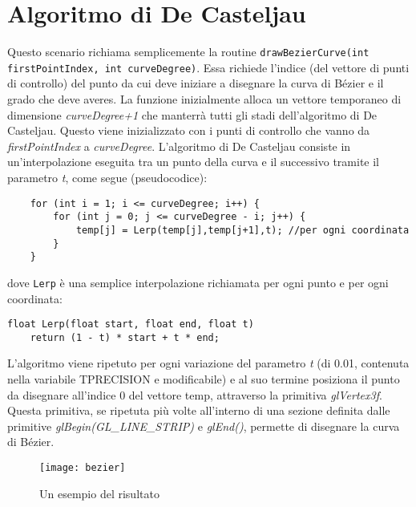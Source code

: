 \newpage
\section{Algoritmo di De Casteljau}
\label{decasteljau}
Questo scenario richiama semplicemente la routine \texttt{drawBezierCurve\-(int firstPointIndex, \-int curveDegree)}. Essa richiede l'indice (del vettore di punti di controllo) del punto da cui deve iniziare a disegnare la curva di Bézier e il grado che deve averes.
La funzione inizialmente alloca un vettore temporaneo di dimensione \textit{curveDegree+1} che manterrà tutti gli stadi dell'algoritmo di De Casteljau. Questo viene inizializzato con i punti di controllo che vanno da \textit{firstPointIndex} a \textit{curveDegree}. L'algoritmo di De Casteljau consiste in un'interpolazione eseguita tra un punto della curva e il successivo tramite il parametro \textit{t}, come segue (pseudocodice):
\begin{lstlisting}
	for (int i = 1; i <= curveDegree; i++) {
		for (int j = 0; j <= curveDegree - i; j++) {
			temp[j] = Lerp(temp[j],temp[j+1],t); //per ogni coordinata
		}
	}
\end{lstlisting}
dove \texttt{Lerp} è una semplice interpolazione richiamata per ogni punto e per ogni coordinata:
\begin{lstlisting}
float Lerp(float start, float end, float t)
	return (1 - t) * start + t * end;
\end{lstlisting}
L'algoritmo viene ripetuto per ogni variazione del parametro \textit{t} (di 0.01, contenuta nella variabile TPRECISION e modificabile) e al suo termine posiziona il punto da disegnare all'indice 0 del vettore temp, attraverso la primitiva \textit{glVertex3f}. Questa primitiva, se ripetuta più volte all'interno di una sezione definita dalle primitive \textit{glBegin(GL\_LINE\_STRIP)} e \textit{glEnd()}, permette di disegnare la curva di Bézier.

 \begin{figure}[htb]
    \centering
    \texttt{[image: bezier]}
    \caption{Un esempio del risultato\label{fig:bezier}}
\end{figure}

\newpage

